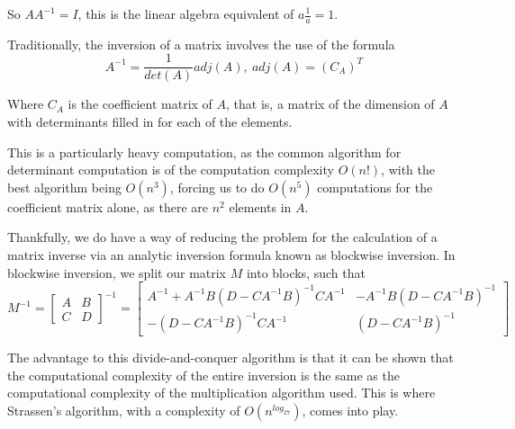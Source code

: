 \documentclass[12pt, letterpaper]{article}
\theoremstyle{remark}
\theoremstyle{remark}
\begin{document}
    So \(AA^{-1} = I\), this is the linear algebra equivalent of \(a\frac{1}{a} = 1\).

    \bigskip

    Traditionally, the inversion of a matrix involves the use of the formula
    \[A^{-1} = \frac{1}{det(A)}adj(A),\ adj(A) = (C_{A})^T\]

    Where \(C_A\) is the coefficient matrix of \(A\), that is, a matrix of 
    the dimension of \(A\) with determinants filled in for each of the elements.

    This is a particularly heavy computation, as the common algorithm for determinant
    computation is of the computation complexity \(O(n!)\), with the best algorithm 
    being \(O(n^3)\), forcing us to do \(O(n^5)\) computations for the coefficient 
    matrix alone, as there are \(n^2\) elements in \(A\).

    \bigskip

    Thankfully, we do have a way of reducing the problem for the calculation of 
    a matrix inverse via an analytic inversion formula known as blockwise inversion. 
    In blockwise inversion, we split our matrix \(M\) into blocks, such that
    \[M^{-1} = \begin{bmatrix*}
        A & B \\
        C & D
    \end{bmatrix*}^{-1} = 
    \begin{bmatrix*}
        A^{-1} + A^{-1}B(D - CA^{-1}B)^{-1}CA^{-1} & -A^{-1}B(D - CA^{-1}B)^{-1} \\
        -(D - CA^{-1}B)^{-1}CA^{-1} & (D - CA^{-1}B)^{-1}
    \end{bmatrix*}\]
    
    The advantage to this divide-and-conquer algorithm is that it can be shown 
    that the computational complexity of the entire inversion is the same as the
    computational complexity of the multiplication algorithm used. This is where 
    Strassen's algorithm, with a complexity of \(O(n^{log_27})\), comes into play.
\end{document}
